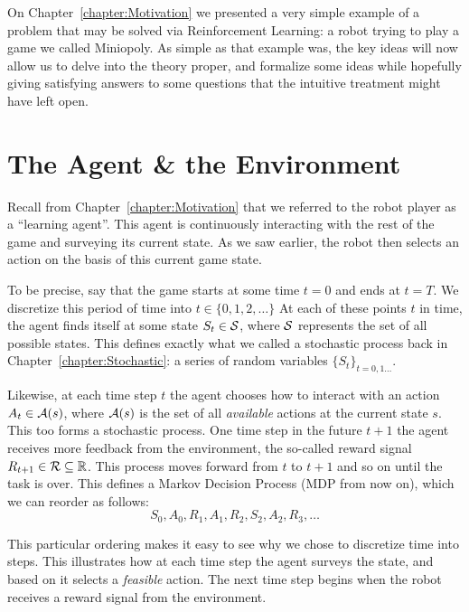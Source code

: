 \label{chapter:ReinforcementLearning}

On Chapter~\ref{chapter:Motivation} we presented a very simple example of a
problem that may be solved via Reinforcement Learning: a robot trying to play a
game we called Miniopoly. As simple as that example was, the key ideas will now
allow us to delve into the theory proper, and formalize some ideas while
hopefully giving satisfying answers to some questions that the intuitive
treatment might have left open.

\section{The Agent \& the Environment} Recall from
Chapter~\ref{chapter:Motivation} that we referred to the robot player as a
``learning agent''. This agent is continuously interacting with the rest of the
game and surveying its current state. As we saw earlier, the robot then selects
an action on the basis of this current game state.

To be precise, say that the game starts at some time $t=0$ and ends at $t=T$. We
discretize this period of time into $t \in \{0, 1, 2, \ldots \}$ At each of
these points $t$ in time, the agent finds itself at some state $S_t \in
\mathcal{S}$, where $\mathcal{S}$ represents the set of all possible states. This
defines exactly what we called a stochastic process back in 
Chapter~\ref{chapter:Stochastic}: a series of random variables $\{ S_t \}_{t =
0, 1 \ldots}$. 

Likewise, at each time step $t$ the agent chooses how to interact with an action
$A_t \in \mathcal{A}(s)$, where $\mathcal{A}(s)$ is the set of all \textit{available}
actions at the current state $s$. This too forms a stochastic process. One time
step in the future $t+1$ the agent receives more feedback from the environment,
the so-called reward signal $R_{t+1} \in \mathcal{R} \subseteq \mathbb{R}$. This process
moves forward from $t$ to $t+1$ and so on until the task is over. This defines a
Markov Decision Process (MDP from now on), which we can reorder as follows:
\begin{equation} S_0, A_0, R_1, A_1, R_2, S_2, A_2, R_3, \ldots \end{equation}

This particular ordering makes it easy to see why we chose to discretize time
into steps. This illustrates how at each time step the agent surveys the state,
and based on it selects a \textit{feasible} action. The next time step begins
when the robot receives a reward signal from the environment. 


